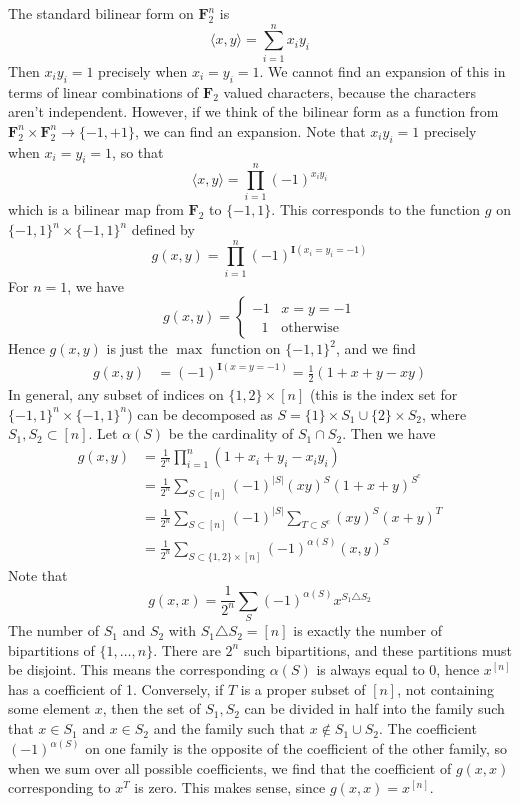 \begin{example}
    The standard bilinear form on $\mathbf{F}_2^n$ is
    \[ \langle x,y \rangle = \sum_{i = 1}^n x_iy_i \]
    Then $x_iy_i = 1$ precisely when $x_i = y_i = 1$. We cannot find an expansion of this in terms of linear combinations of $\mathbf{F}_2$ valued characters, because the characters aren't independent. However, if we think of the bilinear form as a function from $\mathbf{F}_2^n \times \mathbf{F}_2^n \to \{ -1, +1 \}$, we can find an expansion. Note that $x_iy_i = 1$ precisely when $x_i = y_i = 1$, so that
    \[ \langle x, y \rangle = \prod_{i = 1}^n (-1)^{x_iy_i} \]
    which is a bilinear map from $\mathbf{F}_2$ to $\{ -1, 1 \}$. This corresponds to the function $g$ on $\{ -1, 1 \}^n \times \{ -1, 1 \}^n$ defined by
    \[ g(x,y) = \prod_{i = 1}^n (-1)^{\mathbf{I}(x_i = y_i = -1)} \]
    For $n = 1$, we have
    \[ g(x,y) = \begin{cases} -1 & x = y = -1 \\ \ \ \ 1 & \text{otherwise} \end{cases} \]
    Hence $g(x,y)$ is just the $\max$ function on $\{ -1, 1 \}^2$, and we find
    \begin{align*}
        g(x,y) &= (-1)^{\mathbf{I}(x = y = -1)} = \frac{1}{2} (1 + x + y - xy)
    \end{align*}
    In general, any subset of indices on $\{ 1, 2 \} \times [n]$ (this is the index set for $\{ -1, 1 \}^n \times \{ -1, 1 \}^n$) can be decomposed as $S = \{ 1 \} \times S_1 \cup \{ 2 \} \times S_2$, where $S_1, S_2 \subset [n]$. Let $\alpha(S)$ be the cardinality of $S_1 \cap S_2$. Then we have
    \begin{align*}
        g(x,y) &= \frac{1}{2^n} \prod_{i = 1}^n (1 + x_i + y_i - x_iy_i)\\
        &= \frac{1}{2^n} \sum_{S \subset [n]} (-1)^{|S|} (xy)^S (1 + x + y)^{S^c}\\
        &= \frac{1}{2^n} \sum_{S \subset [n]} (-1)^{|S|} \sum_{T \subset S^c} (xy)^S (x + y)^T\\
        &= \frac{1}{2^n} \sum_{S \subset \{ 1, 2 \} \times [n]} (-1)^{\alpha(S)} (x,y)^S
    \end{align*}
    Note that
    \[ g(x,x) = \frac{1}{2^n} \sum_S (-1)^{\alpha(S)} x^{S_1 \triangle S_2} \]
    The number of $S_1$ and $S_2$ with $S_1 \triangle S_2 = [n]$ is exactly the number of bipartitions of $\{ 1, \dots, n \}$. There are $2^n$ such bipartitions, and these partitions must be disjoint. This means the corresponding $\alpha(S)$ is always equal to 0, hence $x^{[n]}$ has a coefficient of 1. Conversely, if $T$ is a proper subset of $[n]$, not containing some element $x$, then the set of $S_1,S_2$ can be divided in half into the family such that $x \in S_1$ and $x \in S_2$ and the family such that $x \not \in S_1 \cup S_2$. The coefficient $(-1)^{\alpha(S)}$ on one family is the opposite of the coefficient of the other family, so when we sum over all possible coefficients, we find that the coefficient of $g(x,x)$ corresponding to $x^T$ is zero. This makes sense, since $g(x,x) = x^{[n]}$.
\end{example}

